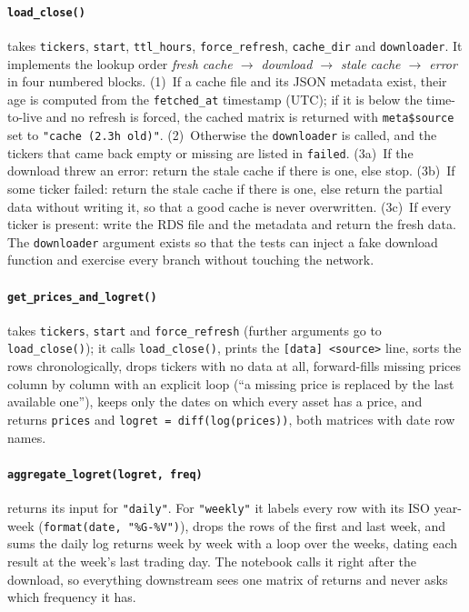 \documentclass[11pt,a4paper]{article}
\newcommand{\code}[1]{\texttt{#1}}
\theoremstyle{plain}
\theoremstyle{remark}
\begin{document}
\paragraph{\code{load\_close()}} takes \code{tickers}, \code{start},
\code{ttl\_hours}, \code{force\_refresh}, \code{cache\_dir} and
\code{downloader}. It implements the lookup order
\emph{fresh cache $\to$ download $\to$ stale cache $\to$ error} in four
numbered blocks. (1)~If a cache file and its JSON metadata exist, their age
is computed from the \code{fetched\_at} timestamp (UTC); if it is below the
time-to-live and no refresh is forced, the cached matrix is returned with
\code{meta\$source} set to \code{"cache (2.3h old)"}. (2)~Otherwise the
\code{downloader} is called, and the tickers that came back empty or
missing are listed in \code{failed}. (3a)~If the download threw an error:
return the stale cache if there is one, else stop. (3b)~If some ticker
failed: return the stale cache if there is one, else return the partial
data without writing it, so that a good cache is never overwritten.
(3c)~If every ticker is present: write the RDS file and the metadata and
return the fresh data. The \code{downloader} argument exists so that the
tests can inject a fake download function and exercise every branch without
touching the network.

\paragraph{\code{get\_prices\_and\_logret()}} takes \code{tickers}, \code{start} and \code{force\_refresh} (further arguments go to \code{load\_close()}); it calls \code{load\_close()}, prints the \code{[data] <source>} line, sorts
the rows chronologically, drops tickers with no data at all, forward-fills
missing prices column by column with an explicit loop (``a missing price
is replaced by the last available one''), keeps only the dates on which
every asset has a price, and returns \code{prices} and
\code{logret = diff(log(prices))}, both matrices with date row names.

\paragraph{\code{aggregate\_logret(logret, freq)}} returns its input for
\code{"daily"}. For \code{"weekly"} it labels every row with its ISO
year-week (\code{format(date, "\%G-\%V")}), drops the rows of the first and
last week, and sums the daily log returns week by week with a loop over the
weeks, dating each result at the week's last trading day. The notebook calls
it right after the download, so everything downstream sees one matrix of
returns and never asks which frequency it has.
\end{document}
